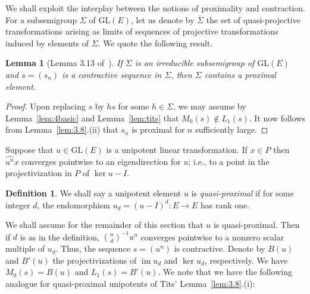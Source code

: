 \documentclass{amsart}
\theoremstyle{plain}
\newtheorem{lemma}[theorem]{Lemma}
\theoremstyle{definition}
\newtheorem{definition}[theorem]{Definition}
\theoremstyle{remark}
\begin{document}
We shall exploit the interplay between the notions of proximality and
contraction. For a subsemigroup $\Sigma$ of $\mathrm{GL}(E)$, let us denote by $\overline{\Sigma}$
the set of quasi-projective transformations arising as limits of sequences of projective
transformations induced by elements of $\Sigma$.
We quote the following result.
\begin{lemma}[Lemma 3.13 of~\cite{MR1348303}]\label{lem:3.13}
If $\Sigma$ is an irreducible subsemigroup of $\mathrm{GL}(E)$ and
$s = (s_{n})$ is a contractive sequence in $\Sigma$, then $\Sigma$ contains a proximal
element.
\end{lemma}
\begin{proof}
Upon replacing $s$ by $hs$ for some $h \in  \Sigma$, we may assume by
Lemma~\ref{lem:4basic} and Lemma~\ref{lem:tits} that
$M_{0}(s) \notin L_{1}(s)$. It now follows from Lemma~\ref{lem:3.8}.(ii) that $s_{n}$
is proximal for $n$ sufficiently large.
\end{proof}

Suppose that $u \in \mathrm{GL}(E)$ is a unipotent linear transformation. If $x \in P$ then $\widehat{u^{n}}x$
converges pointwise to an eigendirection for $u$; i.e., to a point in the
projectivization in $P$ of $\ker
u - I$.

\begin{definition} We shall say a unipotent element $u$ is \emph{quasi-proximal} if for
some integer $d$, the
endomorphism $u_{d} = (u - I)^{d}: E \to E$ has rank one.
\end{definition}

We shall assume for the remainder of this section that $u$ is quasi-proximal. Then if
$d$ is as in the definition,
$\binom{n}{d}^{-1}u^{n}$ converges pointwise to a nonzero scalar multiple of $u_{d}$.
Thus, the sequence $s = (u^{n})$ is contractive.
Denote by $B(u)$ and $B'(u)$ the projectivizations of $\operatorname{im} u_{d}$ and $\ker
u_{d}$, respectively. We have $M_{0}(s) = B(u)$ and $L_{1}(s) = B'(u)$. We note that we have the
following analogue for quasi-proximal unipotents of Tits' Lemma~\ref{lem:3.8}.(i):
\end{document}
